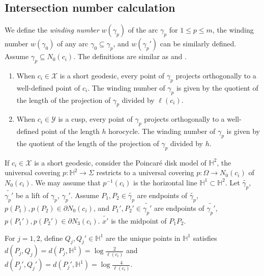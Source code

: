 \documentclass[11pt, a4paper]{article}
\theoremstyle{definition}
\theoremstyle{remark}
\newcommand{\bbh}{\mathbb{H}}
\newcommand{\calx}{\mathcal{X}}
\newcommand{\caly}{\mathcal{Y}}
\begin{document}
\subsection{Intersection number calculation}

We define the \emph{winding number} $w(\gamma_p)$ of the arc $\gamma_p$ for $1\leqslant p\leqslant m$, the winding number $w(\gamma_0)$ of any arc $\gamma_0\subseteq\gamma_p$, and $w(\gamma_p')$ can be similarly defined. Assume $\gamma_p\subseteq N_0(c_i)$. The definitions are similar as \cite{Y2805} and \cite{EP2802}.

\begin{enumerate}
\item
When $c_i\in\calx$ is a short geodesic, every point of $\gamma_p$ projects orthogonally to a well-defined point of $c_i$. The winding number of $\gamma_p$ is given by the quotient of the length of the projection of $\gamma_p$ divided by $\ell(c_i)$.

\item
When $c_i\in\caly$ is a cusp, every point of $\gamma_p$ projects orthogonally to a well-defined point of the length $h$ horocycle. The winding number of $\gamma_p$ is given by the quotient of the length of the projection of $\gamma_p$ divided by $h$.


\end{enumerate} 


If $c_i\in\calx$ is a short geodesic, consider the Poincar\'{e} disk model of $\bbh^2$, the universal covering $p:\bbh^2\to\Sigma$ restricts to a universal covering $p:\Omega\to N_0(c_i)$ of $N_0(c_i)$. We may assume that $p^{-1}(c_i)$ is the horizontal line $\bbh^1\subset\bbh^2$. Let $\widetilde{\gamma_p}$, $\widetilde{\gamma_p'}$ be a lift of $\gamma_p$, $\gamma_p'$. Assume $P_1,P_2\in \widetilde{\gamma_p}$ are endpoints of $\widetilde{\gamma_p}$, $p(P_1),p(P_2)\in\partial N_0(c_i)$, and $P_1',P_2'\in \widetilde{\gamma_p'}$ are endpoints of $\widetilde{\gamma_p'}$, $p(P_1'),p(P_2')\in\partial N_3(c_i)$. $\widetilde{x'}$ is the midpoint of $P_1P_2$.

For $j=1,2$, define $Q_j, Q_j'\in\bbh^1$ are the unique points in $\bbh^1$ satisfies $d(P_j,Q_j)=d(P_j,\bbh^1)=\log\frac2{\ell(c_i)}$ and $d(P_j',Q_j')=d(P_j',\bbh^1)=\log\frac4{\ell(c_i)}$. 
\end{document}
